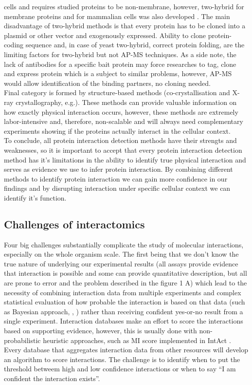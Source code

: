 \documentclass[12pt,]{report}
\begin{document}
cells and requires studied proteins to be non-membrane, however,
two-hybrid for membrane proteins and for mammalian cells was also
developed \citep[\citet{Saraon:2017aa}]{Lemmens:2015aa}. The main
disadvantage of two-hybrid methods is that every protein has to be
cloned into a plasmid or other vector and exogenously expressed. Ability
to clone protein-coding sequence and, in case of yeast two-hybrid,
correct protein folding, are the limiting factors for two-hybrid but not
AP-MS techniques. As a side note, the lack of antibodies for a specific
bait protein may force researches to tag, clone and express protein
which is a subject to similar problems, however, AP-MS would allow
identification of the binding partners, no cloning needed.\\
Final category is formed by structure-based methods (co-crystallisation
and X-ray crystallography, e.g.). These methods can provide valuable
information on how exactly physical interaction occurs, however, these
methods are extremely labor-intensive and, therefore, non-scalable and
will always need complementary experiments showing if the proteins
actually interact in the cellular context.\\
To conclude, all protein interaction detection methods have their
strengts and weaknesses, so it is important to accept that every protein
interaction detection method has it's limitations in the ability to
identify true physical interaction and serves as evidence we use to
infer protein interaction. By combining different methods to identify
protein interaction we can gain more confidence in our findings and by
disrupting interaction under specific cellular context we can identify
it's function.

\subsection{Challenges of
interactomics}\label{challenges-of-interactomics}

Four big challenges substantially complicate the study of molecular
interactions, especially on the whole organism scale. The first being
that we don't know the true nature of underlying our experimental
results (all assays provide evidence that interaction is possible and
some can provide quantitative description, but all are prone to error
and the problem described in the figure 1 A) which lead to the necessity
of combining interaction data from multiple experiments and complex
statistical evaluation of how probable the interaction is based on that
data (such as Bayesian approach, \citet{Braun:2009aa},
\citet{Zhang:2011aa}) rather than receiving confident yes-or-no result
from a single experiment. Interaction databases make an effort to score
the interactions based on supporting evidence, however, this is usually
done with non-probabilistic heuristic approaches, such as MI score
implemented in IntAct \citep{Villaveces:2015aa}. Every database that
aggregates interaction data from other resources will develop an
algorithm to score interactions. The challenge is to identify when to
put the threshold betweem high and low confidence interactions or when
to say ``I am confident the interaction exists''.
\end{document}
